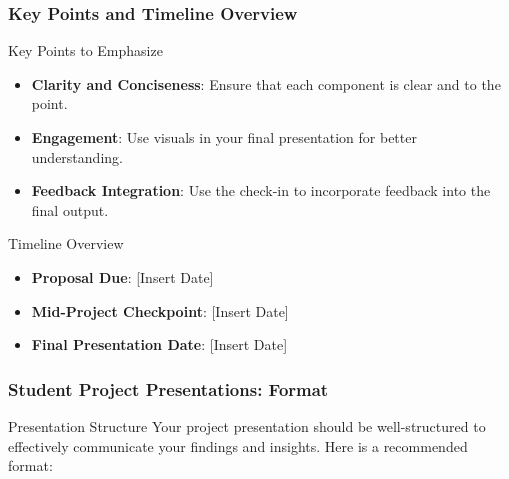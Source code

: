 \documentclass[aspectratio=169]{beamer}
\begin{document}
\begin{frame}[fragile]
    \frametitle{Key Points and Timeline Overview}
    \begin{block}{Key Points to Emphasize}
        \begin{itemize}
            \item \textbf{Clarity and Conciseness}: Ensure that each component is clear and to the point.
            \item \textbf{Engagement}: Use visuals in your final presentation for better understanding.
            \item \textbf{Feedback Integration}: Use the check-in to incorporate feedback into the final output.
        \end{itemize}
    \end{block}
    \begin{block}{Timeline Overview}
        \begin{itemize}
            \item \textbf{Proposal Due}: [Insert Date]
            \item \textbf{Mid-Project Checkpoint}: [Insert Date]
            \item \textbf{Final Presentation Date}: [Insert Date]
        \end{itemize}
    \end{block}
\end{frame}

\begin{frame}[fragile]
    \frametitle{Student Project Presentations: Format}
    \begin{block}{Presentation Structure}
        Your project presentation should be well-structured to effectively communicate your findings and insights. Here is a recommended format:
    \end{block}
\end{frame}
\end{document}

